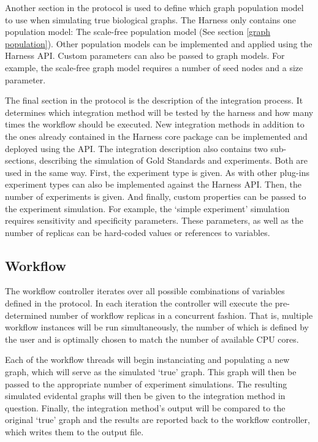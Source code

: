 \documentclass{scrartcl}
\begin{document}
Another section in the protocol is used to define which graph population model to use when simulating true biological graphs. The Harness only contains one population model: The scale-free population model (See section \ref{graph population}). Other population models can be implemented and applied using the Harness API. Custom parameters can also be passed to graph models. For example, the scale-free graph model requires a number of seed nodes and a size parameter.

The final section in the protocol is the description of the integration process. It determines which integration method will be tested by the harness and how many times the workflow should be executed. New integration methods in addition to the ones already contained in the Harness core package can be implemented and deployed using the API. The integration description also contains two sub-sections, describing the simulation of Gold Standards and experiments. Both are used in the same way. First, the experiment type is given. As with other plug-ins experiment types can also be implemented against the Harness API. Then, the number of experiments is given. And finally, custom properties can be passed to the experiment simulation. For example, the `simple experiment' simulation requires sensitivity and specificity parameters. These parameters, as well as the number of replicas can be hard-coded values or references to variables.


\subsection{Workflow}

The workflow controller iterates over all possible combinations of variables defined in the protocol. In each iteration the controller will execute the pre-determined number of workflow replicas in a concurrent fashion. That is, multiple workflow instances will be run simultaneously, the number of which is defined by the user and is optimally chosen to match the number of available CPU cores. 

Each of the workflow threads will begin instanciating and populating a new graph, which will serve as the simulated `true' graph. This graph will then be passed to the appropriate number of experiment simulations. The resulting simulated evidental graphs will then be given to the integration method in question. Finally, the integration method's output will be compared to the original `true' graph and the results are reported back to the workflow controller, which writes them to the output file.
\end{document}
